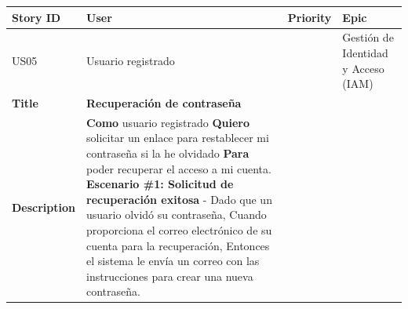 {\def\LTcaptype{none} %
\begin{longtable}[]{@{}
  >{\raggedright\arraybackslash}p{}
  >{\raggedright\arraybackslash}p{}
  >{\raggedright\arraybackslash}p{}
  >{\raggedright\arraybackslash}p{}@{}}
\toprule\noalign{}
\begin{minipage}[b]{\linewidth}\raggedright
Story ID
\end{minipage} & \begin{minipage}[b]{\linewidth}\raggedright
User
\end{minipage} & \begin{minipage}[b]{\linewidth}\raggedright
Priority
\end{minipage} & \begin{minipage}[b]{\linewidth}\raggedright
Epic
\end{minipage} \\
\midrule\noalign{}
\endhead
\bottomrule\noalign{}
\endlastfoot
US05 & Usuario registrado & 2 & Gestión de Identidad y Acceso (IAM) \\
\textbf{Title} & \textbf{Recuperación de contraseña} & & \\
\textbf{Description} & \textbf{Como} usuario registrado \textbf{Quiero}
solicitar un enlace para restablecer mi contraseña si la he olvidado
\textbf{Para} poder recuperar el acceso a mi cuenta. \textbf{Escenario
\#1: Solicitud de recuperación exitosa} - Dado que un usuario olvidó su
contraseña, Cuando proporciona el correo electrónico de su cuenta para
la recuperación, Entonces el sistema le envía un correo con las
instrucciones para crear una nueva contraseña. & & \\
\end{longtable}
}

